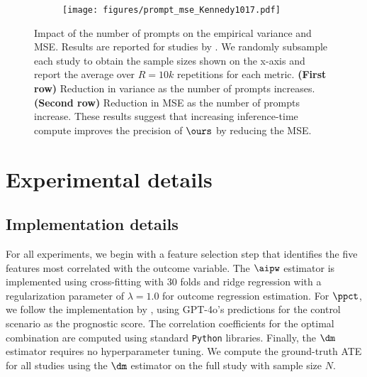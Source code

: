 \begin{figure}[t!]
\begin{subfigure}[t]{0.3\textwidth}
        \end{subfigure}
        \begin{subfigure}[t]{0.3\textwidth}
        \texttt{[image: figures/prompt\_mse\_Kennedy1017.pdf]}
     \caption{}            \label{fig:prompt_mse_k}

        \end{subfigure}
    
\caption{\small{Impact of the number of prompts on the empirical variance and MSE. Results are reported for studies by \citet{brandt2013onset, silverman2022putting, kennedy2020accidental}. We randomly subsample each study to obtain the sample sizes shown on the x-axis and report the average over $R=10k$ repetitions for each metric. \textbf{(First row)} Reduction in variance as the number of prompts increases. \textbf{(Second row)} Reduction in MSE as the number of   prompts increase. These results suggest that increasing inference-time compute improves the precision of $\ours$ by reducing the MSE.}}

    \label{fig:prompts_comparison}
\end{figure}



\newpage
\section{Experimental details}
\label{apx:expdetails}



\subsection{Implementation details}
\label{apx:implementation}

For all experiments, we begin with a feature selection step that identifies the five features most correlated with the outcome variable. The $\aipw$ estimator is implemented using cross-fitting with 30 folds and ridge regression with a regularization parameter of $\lambda=1.0$ for outcome regression estimation. For $\ppct$, we follow the implementation by \citet{poulet2025prediction}, using GPT-4o's predictions for the control scenario as the prognostic score. The correlation coefficients for the optimal combination are computed using standard \texttt{Python} libraries. Finally, the $\dm$ estimator requires no hyperparameter tuning. We compute the ground-truth ATE for all studies using the $\dm$ estimator on the full study with sample size $N$.



